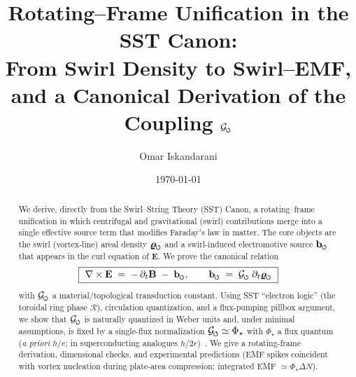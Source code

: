 \documentclass[11pt,a4paper]{article}
\title{Rotating--Frame Unification in the SST Canon: \\
From Swirl Density to Swirl--EMF, and a Canonical Derivation of the Coupling $\mathcal G_{\rm \swirlarrow}$}
\author{Omar Iskandarani}
\date{\today}
\newcommand{\swirlarrow}{%
    \mathchoice{\mkern-2mu\scriptstyle\boldsymbol{\circlearrowleft}}%
    {\mkern-2mu\scriptstyle\boldsymbol{\circlearrowleft}}%
    {\mkern-2mu\scriptscriptstyle\boldsymbol{\circlearrowleft}}%
    {\mkern-2mu\scriptscriptstyle\boldsymbol{\circlearrowleft}}%
}
\begin{document}
\maketitle

\begin{abstract}
We derive, directly from the Swirl--String Theory (SST) Canon, a rotating--frame unification in which centrifugal and gravitational (swirl) contributions merge into a single effective source term that modifies Faraday's law in matter. The core objects are the swirl (vortex-line) areal density $\bm{\varrho}_{\rm \swirlarrow}$ and a swirl-induced electromotive source $\mathbf b_{\rm \swirlarrow}$ that appears in the curl equation of $\mathbf E$. We prove the canonical relation
\[
    \boxed{\ \nabla\times\mathbf E \;=\; -\,\partial_t\mathbf B \;-\; \mathbf b_{\rm \swirlarrow}, \qquad
    \mathbf b_{\rm \swirlarrow} \;=\; \mathcal G_{\rm \swirlarrow}\;\partial_t\bm{\varrho}_{\rm \swirlarrow}\ }
\]
with $\mathcal G_{\rm \swirlarrow}$ a material/topological transduction constant. Using SST ``electron logic'' (the toroidal ring phase $\mathcal R$), circulation quantization, and a flux-pumping pillbox argument, we show that $\mathcal G_{\rm \swirlarrow}$ is naturally quantized in Weber units and, under minimal assumptions, is fixed by a single-flux normalization $\mathcal G_{\rm \swirlarrow}\simeq \Phi_\star$ with $\Phi_\star$ a flux quantum (\emph{a priori} $h/e$; in superconducting analogues $h/2e$)~\cite{Aharonov1959,Tinkham2004,Onsager1949,Feynman1955}. We give a rotating-frame derivation, dimensional checks, and experimental predictions (EMF spikes coincident with vortex nucleation during plate-area compression; integrated EMF $\simeq \Phi_\star \Delta N$).
\end{abstract}
\end{document}
